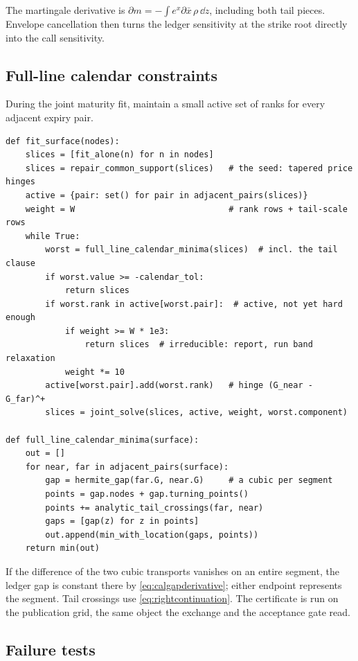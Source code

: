 The martingale derivative is
$\partial m=-\int e^x\partial\bar x\,\rho\,\dd z$, including both tail
pieces.  Envelope cancellation then turns the ledger sensitivity at the
strike root directly into the call sensitivity.

\subsection{Full-line calendar constraints}

During the joint maturity fit, maintain a small active set of ranks for every
adjacent expiry pair.

\begin{lstlisting}[caption={Exchange algorithm for global calendar order.}]
def fit_surface(nodes):
    slices = [fit_alone(n) for n in nodes]
    slices = repair_common_support(slices)   # the seed: tapered price hinges
    active = {pair: set() for pair in adjacent_pairs(slices)}
    weight = W                               # rank rows + tail-scale rows
    while True:
        worst = full_line_calendar_minima(slices)  # incl. the tail clause
        if worst.value >= -calendar_tol:
            return slices
        if worst.rank in active[worst.pair]:  # active, not yet hard enough
            if weight >= W * 1e3:
                return slices  # irreducible: report, run band relaxation
            weight *= 10
        active[worst.pair].add(worst.rank)   # hinge (G_near - G_far)^+
        slices = joint_solve(slices, active, weight, worst.component)

def full_line_calendar_minima(surface):
    out = []
    for near, far in adjacent_pairs(surface):
        gap = hermite_gap(far.G, near.G)     # a cubic per segment
        points = gap.nodes + gap.turning_points()
        points += analytic_tail_crossings(far, near)
        gaps = [gap(z) for z in points]
        out.append(min_with_location(gaps, points))
    return min(out)
\end{lstlisting}

If the difference of the two cubic transports vanishes on an entire segment,
the ledger gap is constant there by \eqref{eq:calgapderivative}; either
endpoint represents the segment.  Tail crossings use
\eqref{eq:rightcontinuation}.  The certificate is run on the
publication grid, the same object the exchange and the acceptance
gate read.

\subsection{Failure tests}

